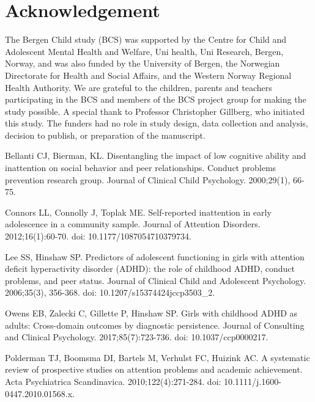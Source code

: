 \documentclass[10pt,letterpaper]{article}
\begin{document}
{\section*{Acknowledgement}
The Bergen Child study (BCS) was supported by the Centre for Child and Adolescent Mental Health and Welfare, Uni health, Uni
Research, Bergen, Norway, and was also funded by the University of Bergen, the Norwegian Directorate for Health and
Social Affairs, and the Western Norway Regional Health Authority. We are grateful to the children, parents and teachers
participating in the BCS and members of the BCS project group for making the study possible. A
special thank to Professor Christopher Gillberg, who initiated this study. The funders had no role in study design, data collection and analysis, decision to publish, or preparation of the manuscript.

\newpage

\begin{thebibliography}{vancouver.bst}

Bellanti CJ, Bierman, KL.
\newblock Disentangling the impact of low cognitive ability and inattention on
  social behavior and peer relationships. Conduct problems prevention research
  group.
\newblock Journal of Clinical Child Psychology. 2000;29(1), 66-75.

Connors LL, Connolly J, Toplak ME.
\newblock Self-reported inattention in early adolescence in a community sample.
\newblock Journal of Attention Disorders.  2012;16(1):60-70. doi: 10.1177/1087054710379734.

Lee SS, Hinshaw SP.
\newblock Predictors of adolescent functioning in girls with attention deficit
  hyperactivity disorder ({ADHD}): the role of childhood {ADHD}, conduct
  problems, and peer status.
\newblock Journal of Clinical Child and Adolescent Psychology. 2006;35(3), 356-368. doi: 10.1207/s15374424jccp3503\_2.

Owens EB, Zalecki C, Gillette P, Hinshaw SP.
\newblock Girls with childhood ADHD as adults: Cross-domain outcomes by
  diagnostic persistence.
\newblock Journal of Consulting and Clinical Psychology. 2017;85(7):723-736. doi: 10.1037/ccp0000217.

Polderman TJ, Boomsma DI, Bartels M, Verhulst FC, Huizink AC.
\newblock A systematic review of prospective studies on attention problems and
  academic achievement.
\newblock Acta Psychiatrica Scandinavica. 2010;122(4):271-284. doi: 10.1111/j.1600-0447.2010.01568.x.


\end{thebibliography}}
\end{document}
